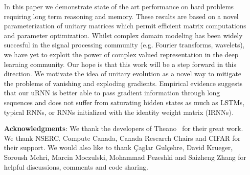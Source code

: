 \documentclass{article}
\begin{document}
In this paper we demonstrate state of the art performance on hard problems requiring
long term reasoning and memory. These results are based on a novel parameterization of unitary matrices which permit
efficient matrix computations and parameter optimization. Whilst complex domain modeling has been 
widely succesful in the signal processing community (e.g. Fourier transforms, wavelets), we have yet to 
exploit the power of complex valued representation in the deep learning community. Our hope is that this
work will be a step forward in this direction. We motivate the idea of unitary evolution as a novel way
to mitigate the problems of vanishing and exploding gradients. Empirical evidence suggests that our uRNN is better able
to pass gradient information through long sequences and does not suffer from saturating hidden states as much
as LSTMs, typical RNNs, or RNNs initialized with the identity weight matrix (IRNNs).



\bigskip
{\bf Acknowledgments}: We thank the developers of
Theano~\citep{Fred2010} for their great work. We thank NSERC, Compute Canada, Canada Research Chairs and CIFAR for their support. We would also like to thank \c{C}aglar Gul\c{c}ehre, David Krueger, Soroush Mehri, Marcin Moczulski, Mohammad Pezeshki and Saizheng Zhang for helpful discussions, comments and code sharing.




\end{document}
